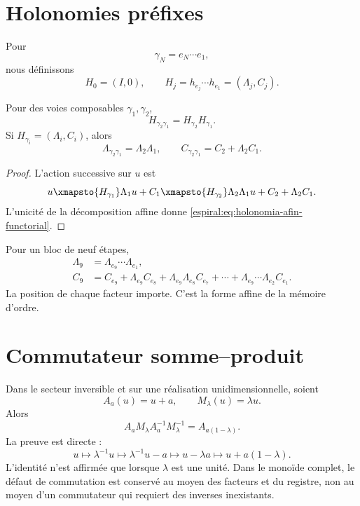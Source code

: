 \section{Holonomies préfixes}

Pour
\[
 \gamma_N=e_N\cdots e_1,
\]
nous définissons
\[
 H_0=(I,0),\qquad
 H_j=h_{e_j}\cdots h_{e_1}=(\Lambda_j,C_j).
\]

\begin{theorem}
Pour des voies composables \(\gamma_1,\gamma_2\),
\[
 H_{\gamma_2\gamma_1}=H_{\gamma_2}H_{\gamma_1}.
\]
Si \(H_{\gamma_i}=(\Lambda_i,C_i)\), alors
\begin{equation}
 \Lambda_{\gamma_2\gamma_1}=\Lambda_2\Lambda_1,
 \qquad
 C_{\gamma_2\gamma_1}=C_2+\Lambda_2C_1.
 \label{espiral:eq:holonomia-afin-functorial}
\end{equation}
\end{theorem}
\begin{proof}
L'action successive sur \(u\) est
\[
 u\xmapsto{H_{\gamma_1}}\Lambda_1u+C_1
 \xmapsto{H_{\gamma_2}}
 \Lambda_2\Lambda_1u+C_2+\Lambda_2C_1.
\]
L'unicité de la décomposition affine donne \cref{espiral:eq:holonomia-afin-functorial}.
\end{proof}

Pour un bloc de neuf étapes,
\begin{align}
 \Lambda_9&=\Lambda_{e_9}\cdots\Lambda_{e_1},\\
 C_9&=C_{e_9}+\Lambda_{e_9}C_{e_8}
 +\Lambda_{e_9}\Lambda_{e_8}C_{e_7}+\cdots
 +\Lambda_{e_9}\cdots\Lambda_{e_2}C_{e_1}.
 \label{espiral:eq:traslacion-nueve}
\end{align}
La position de chaque facteur importe. C'est la forme affine de la mémoire d'ordre.

\section{Commutateur somme--produit}

Dans le secteur inversible et sur une réalisation unidimensionnelle, soient
\[
 A_a(u)=u+a,\qquad M_\lambda(u)=\lambda u.
\]
Alors
\begin{equation}
 A_aM_\lambda A_a^{-1}M_\lambda^{-1}
 =A_{a(1-\lambda)}.
 \label{espiral:eq:conmutador-afin}
\end{equation}
La preuve est directe :
\[
 u\mapsto\lambda^{-1}u\mapsto\lambda^{-1}u-a
 \mapsto u-\lambda a\mapsto u+a(1-\lambda).
\]
L'identité n'est affirmée que lorsque \(\lambda\) est une unité. Dans le monoïde complet, le défaut de commutation est conservé au moyen des facteurs et du registre, non au moyen d'un commutateur qui requiert des inverses inexistants.

